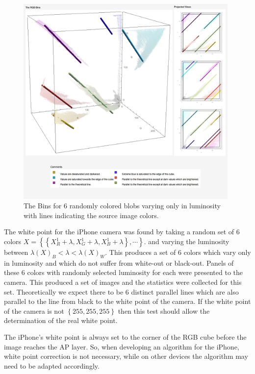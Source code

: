 \begin{figure}[h!]
  \centering
    \includegraphics[width=0.98\textwidth]{Chapter3/Figs/Theory_And_Practice.jpg}
    \caption{The Bins for 6 randomly colored blobs varying only in luminosity with lines indicating the source image colors.}  \label{fig:WhitePoint}
\end{figure}

The white point for the iPhone camera was found by taking a random set of 6 colors $X=\left\{ \left\{X^1_R +\lambda, X^1_G  +\lambda, X^1_B +\lambda \right\}, \cdots \right\} $. and varying the luminosity between  $ \lambda(X)_B < \lambda  < \lambda(X)_W$. This produces a set of 6 colors which vary only in luminosity and which do not suffer from white-out or black-out. Panels of these 6 colors with randomly selected luminosity for each were presented to the camera. This produced a set of images and the statistics were collected for this set. Theoretically we expect there to be 6 distinct parallel lines which are also parallel to the line from black to the white point of the camera. If the white point of the camera is not $\left\{ 255,255,255\right\}$ then this test should allow the determination of the real white point. 

The iPhone's white point is always set to the corner of the RGB cube before the image reaches the AP layer. So, when developing an algorithm for the iPhone, white point correction is not necessary, while on other devices the algorithm may need to be adapted accordingly.
